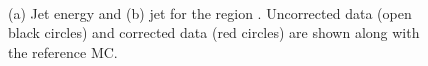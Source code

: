 \begin{figure}
\centering
\mbox{
              \quad
              \quad
}
\caption[]{
(a) Jet energy and (b) jet \pt{} for the region .
Uncorrected data (open black circles) and corrected data (red circles) are shown along with the reference MC. 
\label{JetPerf:E_PtData}}
\end{figure}




